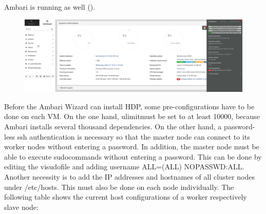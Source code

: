 Ambari is running as well (\cite{RN2}).
\begin{figure}[H]
\hspace{-3.2cm}
\includegraphics[width=1.5\textwidth]{img/figure2_webmin}\label{fig:figure2_webmin}
\label{fig:figure2_webmin}
\end{figure}
Before the Ambari Wizard can install HDP, some pre-configurations have to be done on each VM.
On the one hand, \glqq ulimit\grqq must be set to at least 10000, because Ambari installs several thousand
dependencies. On the other hand, a password-less ssh authentication is necessary so that the
master node can connect to its worker nodes without entering a password. In addition, the master
node must be able to execute \glqq sudo\grqq commands without entering a password. This can be done
by editing the \glqq visudo\grqq file and adding \glqq username ALL=(ALL) NOPASSWD:ALL\grqq . Another
necessity is to add the IP addresses and hostnames of all cluster nodes under \glqq /etc/hosts\grqq . This
must also be done on each node individually. The following table shows the current host
configurations of a worker respectively slave node: